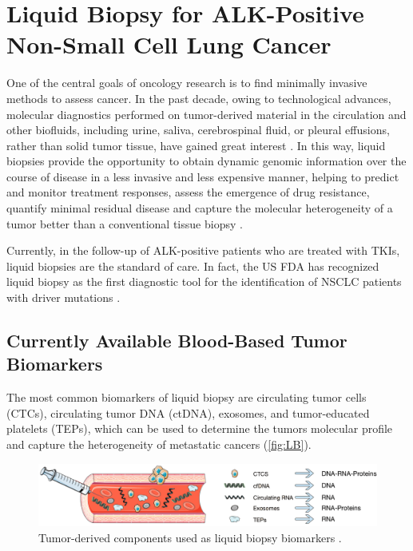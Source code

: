 \section{Liquid Biopsy for ALK-Positive Non-Small Cell Lung Cancer}

One of the central goals of oncology research is to find minimally invasive methods to assess cancer. In the past decade, owing to technological advances, molecular diagnostics performed on tumor-derived material in the circulation and other biofluids, including urine, saliva, cerebrospinal fluid, or pleural effusions, rather than solid tumor tissue, have gained great interest \cite{NSCLC_drivers}. In this way, liquid biopsies provide the opportunity to obtain dynamic genomic information over the course of disease in a less invasive and less expensive manner, helping to predict and monitor treatment responses, assess the emergence of drug resistance, quantify minimal residual disease and capture the molecular heterogeneity of a tumor better than a conventional tissue biopsy \cite{ALK_types_resistance, Liquid_biopsy_NSLC}.

Currently, in the follow-up of ALK-positive patients who are treated with TKIs, liquid biopsies are the standard of care. In fact, the US FDA has recognized liquid biopsy as the first diagnostic tool for the identification of NSCLC patients with driver mutations \cite{Liquid_biopsy_NSLC}.

\subsection{Currently Available Blood-Based Tumor Biomarkers}

The most common biomarkers of liquid biopsy are circulating tumor cells (CTCs), circulating tumor DNA (ctDNA), exosomes, and tumor-educated platelets (TEPs), which can be used to determine the tumors molecular profile and capture the heterogeneity of metastatic cancers (\autoref{fig:LB}).

\begin{figure}[ht]
    \centering
    \includegraphics[width=\textwidth]{Images/chapter_1/liquid_biopsy.png}
    \caption{Tumor-derived components used as liquid biopsy biomarkers \cite{LB_ed}.}
    \label{fig:LB}
\end{figure}

